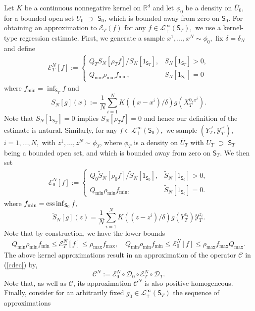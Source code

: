 \documentclass[a4paper,11pt]{amsart}
\theoremstyle{plain}
\theoremstyle{remark}
\newcommand{\essinf}{\mathop{\mathrm{ess\,inf}}\displaylimits}
\begin{document}
Let $K$ be a continuous nonnegative  kernel on $\mathbb{R}%
^{d}$ and let $\phi_0$ be a density on $\overline U_0$, for a bounded open set $U_0$ $\supset$ $\mathsf{S}_{0}$, which is bounded away from zero on $\mathsf{S}_{0}$.
 For obtaining an approximation to $\mathcal{E}_{T}(f)$  for any $f\in\mathcal{L}_{+}^{\infty}(\mathsf{S}_{T}),$
we use  a kernel-type regression estimate. First, we generate a sample  \(x^1,\ldots,x^N\sim \phi_0,\)  fix \(\delta=\delta_N\) and define 
\begin{eqnarray}
\mathcal{E}_{T}^{N}[f]:=
\begin{cases}
Q_T S_N[\rho_T f]/S_N[1_{\mathsf{S}_{T}}], & S_N[1_{\mathsf{S}_{T}}]>0,
\\
Q_{\min}\rho
_{\min}f_{\min}, & S_N[1_{\mathsf{S}_{T}}]=0
\end{cases}
\end{eqnarray}
where \(f_{\min} = \inf_{\mathsf{S}_{T}}f\) and
\[
S_N[g](x):=\frac{1}{N}\sum_{i=1}^{N}K((x-x^{i})/\delta
)g(X_{T}^{0,x^{i}}).
\]
 Note that \(S_N[1_{\mathsf{S}_{T}}]=0\) implies \(S_N[\rho_T f]=0\) and hence our definition of the estimate is natural.
Similarly, for any $f\in\mathcal{L}_{+}^{\infty}(\mathsf{S}_{0}),$
we sample $(Y_{T}^{z^{i}},\mathcal{Y}_{T}^{z^{i}})$, $i=1,\ldots,N,$ with
$z^{1},\ldots,z^N\sim\phi_T$, where \(\phi_T\) is a  density on $\overline U_T$  with  $U_T$ $\supset$ \(\mathsf{S}_{T}\)  being a bounded open set, and which is bounded away from zero on \(\mathsf{S}_{T}\). We then set%
\begin{eqnarray}
\mathcal{E}_{0}^{N}[f]:=
\begin{cases}
Q_0 \widetilde{S}_N[\rho_0 f]/\widetilde{S}_N[1_{\mathsf{S}_{0}}], & \widetilde{S}_N[1_{\mathsf{S}_{0}}]>0,
\\
Q_{\min}\rho
_{\min}f_{\min}, & \widetilde{S}_N[1_{\mathsf{S}_{0}}]=0.
\end{cases}
\end{eqnarray}
where  \(f_{\min} = \essinf_{\mathsf{S}_{0}}f,\)
\[
\widetilde{S}_N[g](z)=\frac{1}{N}\sum_{i=1}^{N}K((z-z^{i})/\delta
)g(Y_{T}^{z_{i}})\mathcal{Y}_{T}^{z_{i}}.
\]
Note that by construction, we have the lower bounds%
\begin{align}
Q_{\min}\rho_{\min}f_{\min } \leq \mathcal{E}_{T}^{N}[f]     \leq  \rho_{\max} f_{\max}, \quad
Q_{\min}
\rho_{\min}f_{\min } \leq \mathcal{E}_{0}^{N}[f]     \leq  \rho_{\max} f_{\max}{Q_{\max}}.  
\label{eq:EN-bounds}
\end{align}
The above kernel approximations 
result in an approximation of the operator
$\mathcal{C}$ in (\ref{cdec}) by,
\begin{equation}
\mathcal{C}^{N}:=\mathcal{E}_{0}^{N}\circ\mathcal{D}_{0}%
\circ\mathcal{E}_{T}^{N}\circ\mathcal{D}_{T}.\label{Cappr}%
\end{equation}
Note that, as well as $\mathcal{C}$, its approximation $\mathcal{C}^{N}$
is also positive homogeneous.
Finally,  consider for an arbitrarily fixed $g_{0}\in\mathcal{L}_{+}^{\infty}%
(\mathsf{S}_{T})$ 
the sequence of approximations
\end{document}
